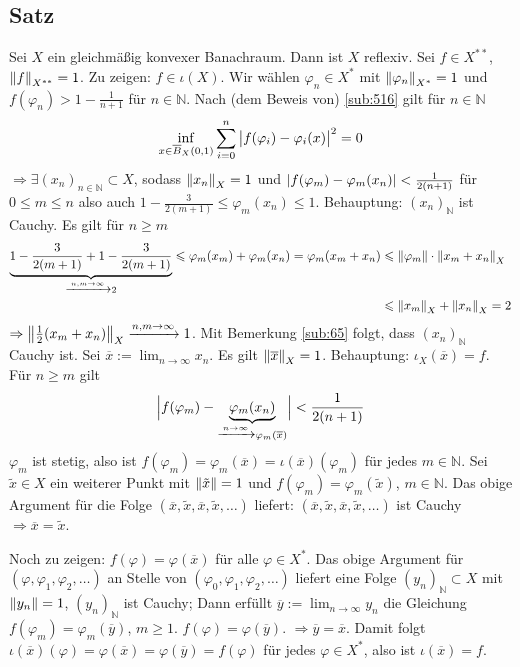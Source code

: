 \subsection{Satz} %
\label{sub:69}
Sei $X$ ein gleichmäßig konvexer Banachraum. Dann ist $X$ reflexiv.
Sei $f \in X^{**}$, $\norm[X^{**}]{f}=1$. Zu zeigen: $f \in \iota(X)$. Wir wählen $\varphi_n \in X^*$ mit $\norm[X^*]{\varphi_n}=1$ und $f(\varphi_n) > 1- \frac{1}{n+1}$
für $n \in \mathds{N}$. Nach (dem Beweis von) \ref{sub:516} gilt für $n \in \mathds{N}$
\[
	\inf_{x \in \overline{B}_X(0,1) } \sum_{i=0}^{n} \,\abs[\big]{f(\varphi_i) - \varphi_i(x)}^2 =0
\]
$\Rightarrow \exists (x_n)_{n \in \mathds{N}} \subset X$, sodass $\norm[X]{x_n}=1$ und $\abs*{f(\varphi_m)- \varphi_m(x_n)} < \frac{1}{2(n+1)}$ für $0 \le m \le n$ also auch
$1- \frac{3}{2(m+1)}\le \varphi_m(x_n) \le 1$. Behauptung: $(x_n)_\mathds{N}$ ist Cauchy. Es gilt für $n \ge m$
\begin{align*}
	\underbrace{1- \frac{3}{2(m+1)}  + 1 - \frac{3}{2(m+1)}}_{\xrightarrow{n,m \to \infty} 2} \le \varphi_m(x_m) + \varphi_m(x_n) = \varphi_m(x_m+x_n) &\le \norm{\varphi_m} \cdot \norm[X]{x_m+x_n} \\
	&\le \norm[X]{x_m} + \norm[X]{x_n} = 2  
\end{align*}
$\Rightarrow \norm[X]{\frac{1}{2} (x_m+x_n)} \xrightarrow{n,m \to \infty} 1$. Mit Bemerkung \ref{sub:65} folgt, dass $(x_n)_\mathds{N}$ Cauchy ist. Sei 
$\overline{x} := \lim_{ n \to \infty} x_n$. Es gilt $\norm[X]{\overline{x}}=1$. Behauptung: $\iota_X(\overline{x})=f$. Für $n \ge m$ gilt
\begin{align*}
	\abs[\Big]{f(\varphi_m) - \underbrace{\varphi_m(x_n)}_{\xrightarrow{n \to \infty} \varphi_m(\overline{x} )}} < \frac{1}{2(n+1)}  
\end{align*}
$\varphi_m$ ist stetig, also ist $f(\varphi_m)=\varphi_m(\overline{x})= \iota(\overline{x})(\varphi_m)$ für jedes $m \in\mathds{N}$. Sei $\tilde{x} \in X$ ein weiterer Punkt
mit $\norm{\tilde{x}}=1$ und $f(\varphi_m) = \varphi_m(\tilde{x})$, $m \in \mathds{N}$. Das obige Argument für die Folge 
$(\overline{x}, \tilde{x}, \overline{x}, \tilde{x}, \ldots)$ liefert: $(\overline{x}, \tilde{x}, \overline{x}, \tilde{x}, \ldots)$ ist Cauchy 
$\Rightarrow \overline{x}=\tilde{x}$.

Noch zu zeigen: $f(\varphi)= \varphi(\overline{x})$ für alle $\varphi \in X^*$. Das obige Argument für $(\varphi, \varphi_1, \varphi_2, \ldots )$ an Stelle von
$(\varphi_0, \varphi_1, \varphi_2,\ldots )$ liefert eine Folge $(y_n)_\mathds{N} \subset X$ mit $\norm{y_n}=1$, $(y_n)_\mathds{N}$ ist Cauchy; 
Dann erfüllt $\overline{y} := \lim_{ n \to \infty} y_n$ die Gleichung $f(\varphi_m)=\varphi_m(\overline{y})$, $m \ge 1$. $f(\varphi)=\varphi(\overline{y})$.
$\Rightarrow \overline{y}=\overline{x}$. Damit folgt $\iota(\overline{x})(\varphi)= \varphi(\overline{x})= \varphi(\overline{y})= f(\varphi)$ für jedes $\varphi \in X^*$,
also ist $\iota(\overline{x})=f$. \bewende

